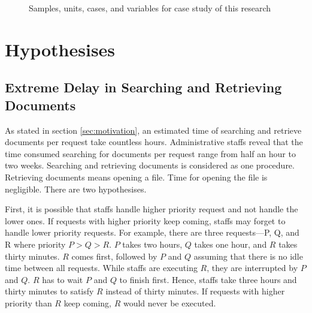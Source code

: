 \begin{figure}[h!]
	\centering
	\caption{Samples, units, cases, and variables for case study of this research}
	\label{fig:our-case-study-method}
	\begin{minipage}{8cm}
	\end{minipage}
\end{figure}


\section{Hypothesises}
\subsection{Extreme Delay in Searching and Retrieving Documents}
As stated in section \ref{sec:motivation}, an estimated time of searching and retrieve documents per request take countless hours.
Administrative staffs reveal that the time consumed searching for documents per request range from half an hour to two weeks.
Searching and retrieving documents is considered as one procedure.
Retrieving documents means opening a file.
Time for opening the file is negligible.
There are two hypothesises.

First, it is possible that staffs handle higher priority request and not handle the lower ones.
If requests with higher priority keep coming, staffs may forget to handle lower priority requests. 
For example, there are three requests---P, Q, and R where priority $P > Q > R$.
$P$ takes two hours, $Q$ takes one hour, and $R$ takes thirty minutes.
$R$ comes first, followed by $P$ and $Q$ assuming that there is no idle time between all requests.
While staffs are executing $R$, they are interrupted by $P$ and $Q$.
$R$ has to wait $P$ and $Q$ to finish first.
Hence, staffs take three hours and thirty minutes to satisfy $R$ instead of thirty minutes.
If requests with higher priority than $R$ keep coming, $R$ would never be executed.


